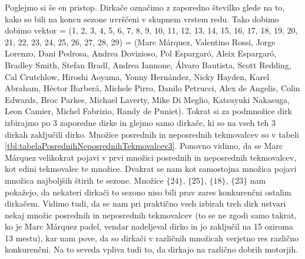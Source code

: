 \documentclass[a4paper, 12pt]{book}
\begin{document}
Poglejmo si še en pristop. Dirkače označimo z zaporedno številko glede na to, kako so bili na koncu sezone uvrščeni v skupnem vrstem redu. Tako dobimo dobimo vektor = (1, 2, 3, 4, 5, 6, 7, 8, 9, 10, 11, 12, 13, 14, 15, 16, 17, 18, 19, 20, 21, 22, 23, 24, 25, 26, 27, 28, 29) = (Marc Márquez, Valentino Rossi, Jorge Lorenzo, Dani Pedrosa, Andrea Dovizioso, Pol Espargaró, Aleix Espargaró, Bradley Smith, Stefan Bradl, Andrea Iannone, Álvaro Bautista, Scott Redding, Cal Crutchlow, Hiroshi Aoyama, Yonny Hernández, Nicky Hayden, Karel Abraham, Héctor Barberá, Michele Pirro, Danilo Petrucci, Alex de Angelis, Colin Edwards, Broc Parkes, Michael Laverty, Mike Di Meglio, Katsuyuki Nakasuga, Leon Camier, Michel Fabrizio, Randy de Puniet). Tokrat si za podmnožice dirk izbirajmo po 3 zaporedne dirke in glejmo samo dirkače, ki so na vseh teh 3 dirkah zaključili dirko. Množice posrednih in neposrednih tekmovalcev so v tabeli \ref{tbl:tabelaPosrednihNeposrednihTekmovalcev3}. Ponovno vidimo, da se Marc Márquez velikokrat pojavi v prvi množici posrednih in neposrednih tekmovalcev, kot edini tekmovalec te množice. Dvakrat se nam kot samostojna množica pojavi množica najboljših štirih te sezone. Množice $\{ 24 \}$, $\{ 25 \}$, $\{ 18 \}$, $\{ 23 \}$ nam pokažejo, da nekateri dirkači to sezono niso bili prav zares konkurenčni ostalim dirkačem. Vidimo tudi, da se nam pri praktično vseh izbirah treh dirk ustvari nekaj množic posrednih in neposrednih tekmovalcev (to se ne zgodi samo takrat, ko je Marc Márquez padel, vendar nadeljeval dirko in jo zaključil na 15 oziroma 13 mestu), kar nam pove, da so dirkači v različnih množicah verjetno res različno konkurenčni. Na to seveda vpliva tudi to, da dirkajo na različno dobrih motorjih. 
\end{document}
